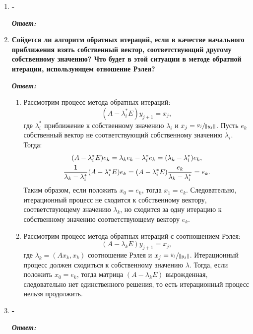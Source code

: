 \documentclass[12pt, a4paper]{article}
\newcommand{\norm}[1]{\lVert #1 \rVert}
\begin{document}
\begin{enumerate}
	
	\item \textbf{-}
	\vspace*{0.2cm}
	
	\textit{\textbf{Ответ:}}
	
	\item \textbf{Сойдется ли алгоритм обратных итераций, если в качестве начального приближения взять собственный вектор, соответствующий другому собственному значению? Что будет в этой ситуации в методе обратной итерации, использующем отношение Рэлея?}
	
	\vspace*{0.2cm}
	
	\textit{\textbf{Ответ:}}
	\begin{enumerate}
		\item Рассмотрим процесс метода обратных итераций:
		\[
		(A - \lambda^{*}_i E)y_{j+1} = x_j,
		\] 
		 где $\lambda^{*}_i$ приближение к собственному значению $\lambda_i$ и $x_{j} = \sfrac{y_j}{\norm{y_{j}}}$. Пусть $e_k$ собственный вектор не соответствующий собственному значению $\lambda_i$. Тогда:
		 \begin{gather}
		 (A - \lambda^{*}_i E) e_k = \lambda_k e_k - \lambda^*_i e_k = (\lambda_k - \lambda^*_i) e_k, \notag \\
		 \frac{1}{\lambda_k - \lambda^*_i}(A - \lambda^{*}_i E) e_k = (A - \lambda^{*}_i E)\frac{e_k}{\lambda_k - \lambda^*_i} =  e_k.
		 \end{gather}
		 Таким образом, если положить $x_0 = e_k$, тогда $x_1 = e_k$. Следовательно, итерационный процесс не сходится к собственному вектору, соответствующему значению  $\lambda_k$, но сходится за одну итерацию к собственному значению соответствующему вектору $e_k$.
		 
		 \item Рассмотрим процесс метода обратных итераций с соотношением Рэлея:
		 \[
		 (A - \lambda_k E)y_{j+1} = x_j,
		 \] 
		 где $\lambda_k = (A x_k, x_k)$ соотношение Рэлея и $x_{j} = \sfrac{y_j}{\norm{y_{j}}}$. Итерационный процесс должен сходиться к  собственному значению $\lambda$. Тогда, если положить $x_0 = e_k$, тогда матрица $(A - \lambda_k E)$ вырожденная, следовательно нет единственного решения, то есть итерационный процесс нельзя продолжить.
	\end{enumerate}
	
	\item \textbf{-}
	\vspace*{0.2cm}
	
	\textit{\textbf{Ответ:}}
	

\end{enumerate}
\end{document}

